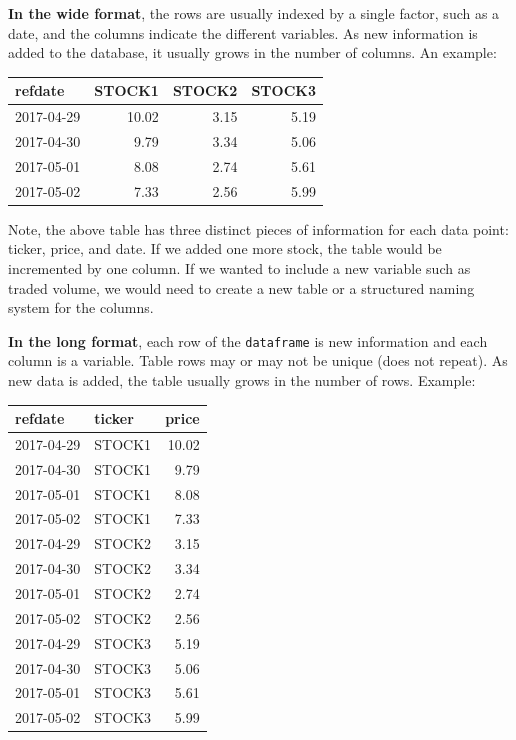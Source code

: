 \documentclass[11pt,]{book}
\begin{document}
\textbf{In the wide format}, the rows are usually indexed by a single
factor, such as a date, and the columns indicate the different
variables. As new information is added to the database, it usually grows
in the number of columns. An example:

\begin{tabular}{l|r|r|r}
\hline
refdate & STOCK1 & STOCK2 & STOCK3\\
\hline
2017-04-29 & 10.02 & 3.15 & 5.19\\
\hline
2017-04-30 & 9.79 & 3.34 & 5.06\\
\hline
2017-05-01 & 8.08 & 2.74 & 5.61\\
\hline
2017-05-02 & 7.33 & 2.56 & 5.99\\
\hline
\end{tabular}

Note, the above table has three distinct pieces of information for each
data point: ticker, price, and date. If we added one more stock, the
table would be incremented by one column. If we wanted to include a new
variable such as traded volume, we would need to create a new table or a
structured naming system for the columns.

\textbf{In the long format}, each row of the \texttt{dataframe} is new
information and each column is a variable. Table rows may or may not be
unique (does not repeat). As new data is added, the table usually grows
in the number of rows. Example:

\begin{tabular}{l|l|r}
\hline
refdate & ticker & price\\
\hline
2017-04-29 & STOCK1 & 10.02\\
\hline
2017-04-30 & STOCK1 & 9.79\\
\hline
2017-05-01 & STOCK1 & 8.08\\
\hline
2017-05-02 & STOCK1 & 7.33\\
\hline
2017-04-29 & STOCK2 & 3.15\\
\hline
2017-04-30 & STOCK2 & 3.34\\
\hline
2017-05-01 & STOCK2 & 2.74\\
\hline
2017-05-02 & STOCK2 & 2.56\\
\hline
2017-04-29 & STOCK3 & 5.19\\
\hline
2017-04-30 & STOCK3 & 5.06\\
\hline
2017-05-01 & STOCK3 & 5.61\\
\hline
2017-05-02 & STOCK3 & 5.99\\
\hline
\end{tabular}
\end{document}
